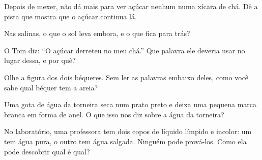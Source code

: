 \begin{exercise}[$\star$]\label{exo:g2:mixing-and-dissolving:6}
Depois de mexer, não dá mais para ver açúcar nenhum numa xícara de chá.
Dê a pista que mostra que o açúcar continua lá.
\end{exercise}

\begin{exercise}[$\star$]\label{exo:g2:mixing-and-dissolving:7}
Nas salinas, o que o sol leva embora, e o que fica para trás?
\end{exercise}

\begin{exercise}[$\star$]\label{exo:g2:mixing-and-dissolving:8}
O Tom diz: ``O açúcar derreteu no meu chá.'' Que palavra ele deveria
usar no lugar dessa, e por quê?
\end{exercise}

\begin{exercise}[$\star\star$]\label{exo:g2:mixing-and-dissolving:9}
Olhe a figura dos dois béqueres. Sem ler as palavras embaixo deles,
como você sabe qual béquer tem a areia?
\end{exercise}

\begin{exercise}[$\star\star$]\label{exo:g2:mixing-and-dissolving:10}
Uma gota de água da torneira seca num prato preto e deixa uma pequena
marca branca em forma de anel. O que isso nos diz sobre a água da
torneira?
\end{exercise}

\begin{exercise}[$\star\star$]\label{exo:g2:mixing-and-dissolving:11}
No laboratório, uma professora tem dois copos de líquido límpido e
incolor: um tem água pura, o outro tem água salgada. Ninguém pode
prová-los. Como ela pode descobrir qual é qual?
\end{exercise}
